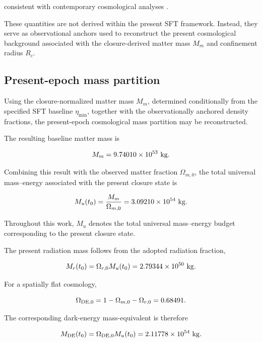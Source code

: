 \documentclass[12pt]{article}
\begin{document}
consistent with contemporary cosmological analyses
\cite{Planck2020,DESI2024,Alam2021}.

These quantities are not derived within the present SFT framework.
Instead, they serve as observational anchors used to reconstruct the
present cosmological background associated with the closure-derived
matter mass \(M_m\) and confinement radius \(R_c\).


\subsection{Present-epoch mass partition}

Using the closure-normalized matter mass
\(M_m\), determined conditionally from the specified SFT baseline
$\eta_{\min}$, together with the observationally anchored density
fractions, the present-epoch cosmological mass partition may be
reconstructed.

The resulting baseline matter mass is

\begin{equation}
M_m
=
9.74010\times10^{53}\ {\rm kg}.
\end{equation}

Combining this result with the observed matter fraction
\(\Omega_{m,0}\), the total universal mass--energy associated with the
present closure state is

\begin{equation}
M_u(t_0)
=
\frac{M_m}{\Omega_{m,0}}
=
3.09210\times10^{54}\ {\rm kg}.
\end{equation}

Throughout this work, \(M_u\) denotes the total universal mass--energy
budget corresponding to the present closure state.

The present radiation mass follows from the adopted radiation fraction,

\begin{equation}
M_r(t_0)
=
\Omega_{r,0} M_u(t_0)
=
2.79344\times10^{50}\ {\rm kg}.
\end{equation}

For a spatially flat cosmology,

\begin{equation}
\Omega_{\rm DE,0}
=
1-\Omega_{m,0}-\Omega_{r,0}
=
0.68491.
\end{equation}

The corresponding dark-energy mass-equivalent is therefore

\begin{equation}
M_{\rm DE}(t_0)
=
\Omega_{\rm DE,0} M_u(t_0)
=
2.11778\times10^{54}\ {\rm kg}.
\end{equation}
\end{document}
